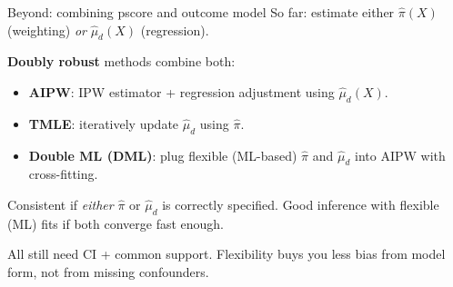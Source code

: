 \documentclass[xcolor=dvipsnames]{beamer}
\begin{document}
\begin{frame}{Beyond: combining pscore and outcome model}
\small
{} So far: estimate either $\widehat{\pi}(X)$ (weighting) \emph{or} $\widehat{\mu}_d(X)$ (regression).

\bigskip
{} \textbf{Doubly robust} methods combine both:
\begin{itemize}
\footnotesize
\item \textbf{AIPW}: IPW estimator + regression adjustment using $\widehat{\mu}_d(X)$.
\item \textbf{TMLE}: iteratively update $\widehat{\mu}_d$ using $\widehat{\pi}$.
\item \textbf{Double ML (DML)}: plug flexible (ML-based) $\widehat{\pi}$ and $\widehat{\mu}_d$ into AIPW with cross-fitting.
\end{itemize}
 Consistent if \textit{either} $\widehat{\pi}$ or $\widehat{\mu}_d$ is correctly specified.  Good inference with flexible (ML) fits if both converge fast enough.


\bigskip
{} All still need CI + common support.  Flexibility buys you less bias from model form, not from missing confounders.
\end{frame}


%
\end{document}
